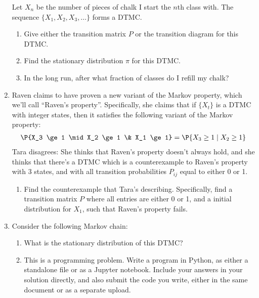 \documentclass{article}
\begin{document}
\begin{enumerate}
    Let $X_n$ be the number of pieces of chalk I start the $n$th class with.
    The sequence $\{X_1, X_2, X_3, \ldots\}$ forms a DTMC.
    \newpage
    \begin{enumerate}
        \item Give either the transition matrix $P$ or the transition diagram for this DTMC.
        \item Find the stationary distribution $\pi$ for this DTMC.
        \item In the long run, after what fraction of classes do I refill my chalk?
    \end{enumerate}
    \item Raven claims to have proven a new variant of the Markov property,
    which we'll call ``Raven's property''.
    Specifically, she claims that if $\{X_t\}$ is a DTMC
    with integer states,
    then it satisfies the following variant of the Markov property:
    \begin{align*}
        \P{X_3 \ge 1 \mid X_2 \ge 1 \& X_1 \ge 1} = \P{X_3 \ge 1 \mid X_2 \ge 1}
    \end{align*}
    Tara disagrees: She thinks that Raven's property doesn't always hold,
    and she thinks that there's a DTMC which is a counterexample to Raven's property
    with 3 states, and with all transition probabilities $P_{ij}$ equal to either 0 or 1.
    \begin{enumerate}
        \item Find the counterexample that Tara's describing.
        Specifically, find a transition matrix $P$ where all entries are either 0 or 1,
        and a initial distribution for $X_1$,
        such that Raven's property fails.
    \end{enumerate}
    \item Consider the following Markov chain:
    
        \begin{enumerate}
            \item What is the stationary distribution of this DTMC?
            \item This is a programming problem. Write a program in Python, as either a standalone file or as a Jupyter notebook.
            Include your answers in your solution directly, and also submit the code you write, either in the same document or as a separate upload.


\end{enumerate}
\end{enumerate}
\end{document}
